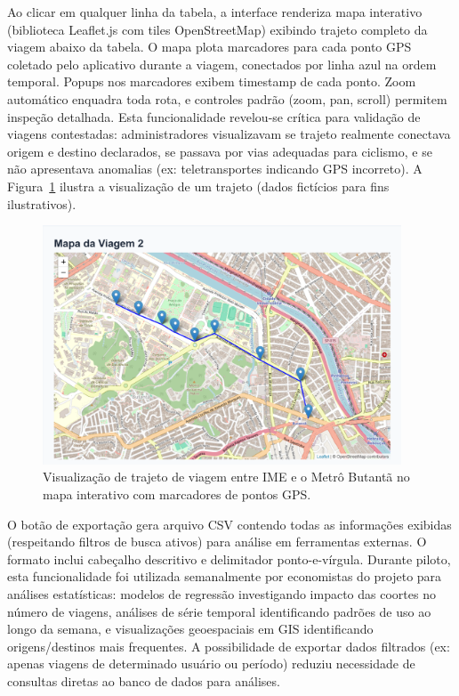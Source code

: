 Ao clicar em qualquer linha da tabela, a interface renderiza mapa interativo (biblioteca Leaflet.js com tiles OpenStreetMap) exibindo trajeto completo da viagem abaixo da tabela. O mapa plota marcadores para cada ponto GPS coletado pelo aplicativo durante a viagem, conectados por linha azul na ordem temporal. Popups nos marcadores exibem timestamp de cada ponto. Zoom automático enquadra toda rota, e controles padrão (zoom, pan, scroll) permitem inspeção detalhada. Esta funcionalidade revelou-se crítica para validação de viagens contestadas: administradores visualizavam se trajeto realmente conectava origem e destino declarados, se passava por vias adequadas para ciclismo, e se não apresentava anomalias (ex: teletransportes indicando GPS incorreto). A Figura~\ref{fig:mapa_contestacao} ilustra a visualização de um trajeto (dados fictícios para fins ilustrativos).

\begin{figure}[H]
    \centering
    \includegraphics[width=0.95\textwidth]{figuras/mapa_contestacao.PNG}
    \caption{Visualização de trajeto de viagem entre IME e o Metrô Butantã no mapa interativo com marcadores de pontos GPS.}
    \label{fig:mapa_contestacao}
  \end{figure}

O botão de exportação gera arquivo CSV contendo todas as informações exibidas (respeitando filtros de busca ativos) para análise em ferramentas externas. O formato inclui cabeçalho descritivo e delimitador ponto-e-vírgula. Durante piloto, esta funcionalidade foi utilizada semanalmente por economistas do projeto para análises estatísticas: modelos de regressão investigando impacto das coortes no número de viagens, análises de série temporal identificando padrões de uso ao longo da semana, e visualizações geoespaciais em GIS identificando origens/destinos mais frequentes. A possibilidade de exportar dados filtrados (ex: apenas viagens de determinado usuário ou período) reduziu necessidade de consultas diretas ao banco de dados para análises.

